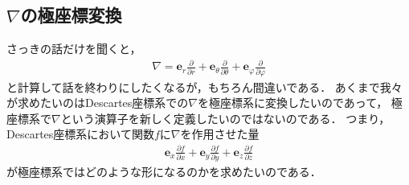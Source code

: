 \subsection{$\nabla$の極座標変換}
さっきの話だけを聞くと，
\begin{align*}
\nabla = \bm{e}_r \frac{ \partial }{\partial r} + \bm{e}_{\theta}
 \frac{ \partial }{\partial \theta } 
 + \bm{e}_{\varphi} \frac{ \partial }{\partial \varphi} 
\end{align*}
と計算して話を終わりにしたくなるが，もちろん間違いである．
あくまで我々が求めたいのはDescartes座標系での$\nabla$を極座標系に変換したいのであって，
極座標系で$\nabla$という演算子を新しく定義したいのではないのである．
つまり，Descartes座標系において関数$f$に$\nabla$を作用させた量
\begin{align*}
\bm{e}_x \frac{ \partial f }{\partial x} + \bm{e}_y \frac{ \partial f } {\partial y}
+ \bm{e}_z \frac{ \partial f }{\partial z}
\end{align*}
が極座標系ではどのような形になるのかを求めたいのである．


